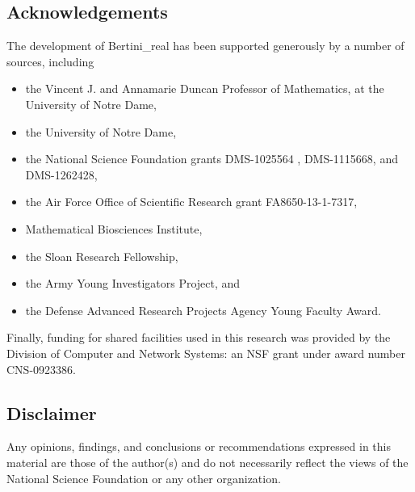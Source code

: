 \subsection{Acknowledgements}

The development of Bertini\_real has been supported generously by a number of sources, including 
\begin{itemize}[noitemsep]
\item the Vincent J. and Annamarie Duncan Professor of Mathematics, at the University of Notre Dame, 
\item the University of Notre Dame, 
\item the National Science Foundation grants DMS-1025564 , DMS-1115668, and DMS-1262428, 
\item the Air Force Office of Scientific Research grant FA8650-13-1-7317, 
\item Mathematical Biosciences Institute, 
\item the Sloan Research Fellowship, 
\item the Army Young Investigators Project, and 
\item the Defense Advanced Research Projects Agency Young Faculty Award.
\end{itemize}

Finally, funding for shared facilities used in this research was provided by the Division of Computer and Network Systems: an NSF grant under award number CNS-0923386.




\subsection*{Disclaimer}

Any opinions, findings, and conclusions or recommendations expressed in this material are those of the author(s) and do not necessarily reflect the views of the National Science Foundation or any other organization.
